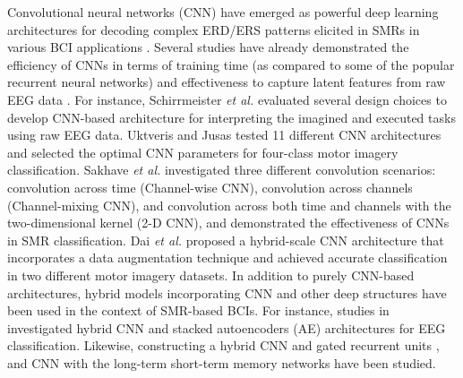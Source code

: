 \documentclass{ieeeaccess}
\begin{document}
Convolutional neural networks (CNN) have emerged as powerful deep learning architectures for decoding complex ERD/ERS patterns elicited in SMRs in various BCI applications \cite{roy2019deep, zhang2019survey}. Several studies have already demonstrated the efficiency of CNNs in terms of training time (as compared to some of the popular recurrent neural networks) and effectiveness to capture latent features from raw EEG data \cite{aggarwal2019signal}. For instance, Schirrmeister \textit{et al.} \cite{schirrmeister2017deep} evaluated several design choices to develop CNN-based architecture for interpreting the imagined and executed tasks using raw EEG data. Uktveris and Jusas \cite{uktveris2017application} tested 11 different CNN architectures and selected the optimal CNN parameters for four-class motor imagery classification. 
Sakhave \textit{et al.}  \cite{sakhavi2018learning} investigated three different convolution scenarios: convolution across time (Channel-wise CNN), convolution across channels (Channel-mixing CNN), and convolution across both time and channels with the two-dimensional kernel (2-D CNN), and demonstrated the effectiveness of CNNs in SMR classification. Dai \textit{et al.} \cite{dai2019hs} proposed a hybrid-scale CNN architecture that incorporates a data augmentation technique and achieved accurate classification in two different motor imagery datasets. In addition to purely CNN-based architectures, hybrid models incorporating CNN and other deep structures have been used in the context of SMR-based BCIs. For instance, studies in \cite{tabar2016novel, tang2018hybrid, dai2019eeg} investigated hybrid CNN and stacked autoencoders (AE) architectures for EEG classification. Likewise, constructing a hybrid CNN and gated recurrent units \cite{qiao2019deep}, and CNN with the long-term short-term memory networks \cite{zhang2019novel} have been studied.
\end{document}
